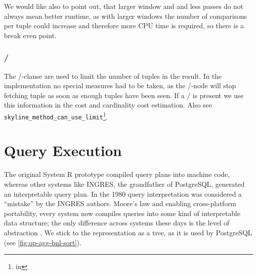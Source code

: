 We would like also to point out, that larger window and and less
passes do not always mean better runtime, as with larger windows the
number of comparisons per tuple could increase and therefore more CPU
time is required, so there is a break even point. 

\subsubsection{ / }
The /-clause are used to limit the
number of tuples in the result.  In the implementation no special
measures had to be taken, as the /-node will stop fetching tuple as soon as enough tuples have been
seen.  If a / is present we use
this information in the cost and cardinality cost estimation.  Also
see \texttt{skyline\_method\_can\_use\_limit}\footnote{in
}.

\section{Query Execution}
\label{sec:queryexecution}

The original System R prototype compiled query plans into machine
code, whereas other systems like INGRES, the grandfather of
PostgreSQL, generated an interpretable query plan. In the 1980 query
interpretation was considered a ``mistake'' by the INGRES
authors. Moore's law and enabling cross-platform portability, every
system now compiles queries into some kind of interpretable data
structure; the only difference across systems these days is the level
of abstraction \citep{Hellerstein2005}. We stick to the representation
as a tree, as it is used by PostgreSQL (see
\autoref{fig:qp-agg-bnl-sort}).

